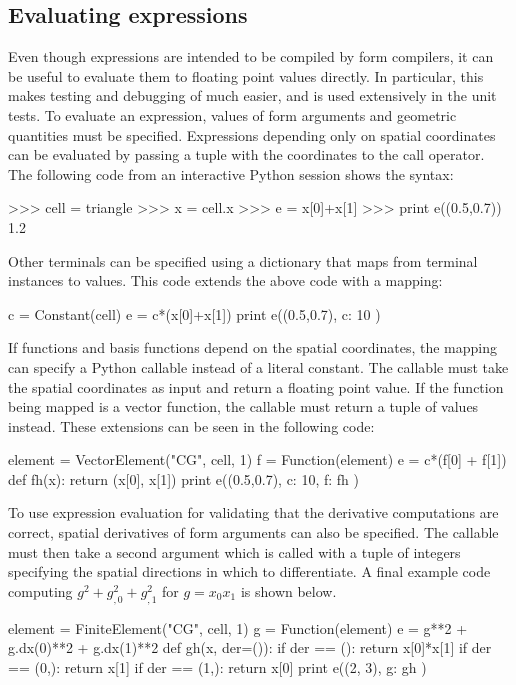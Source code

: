 \subsection{Evaluating expressions}
\label{ufl:sec:evaluating}

Even though \ufl{} expressions are intended to be compiled by form
compilers, it can be useful to evaluate them to floating point values
directly. In particular, this makes testing and debugging of \ufl{}
much easier, and is used extensively in the unit tests.  To evaluate
an \ufl{} expression, values of form arguments and geometric
quantities must be specified.  Expressions depending only on spatial
coordinates can be evaluated by passing a tuple with the coordinates
to the call operator. The following code from an interactive Python
session shows the syntax:
\begin{code}
>>> cell = triangle
>>> x = cell.x
>>> e = x[0]+x[1]
>>> print e((0.5,0.7))
1.2
\end{code}
Other terminals can be specified using a dictionary that maps from
terminal instances to values.  This code extends the above code with a
mapping:
\begin{code}
c = Constant(cell)
e = c*(x[0]+x[1])
print e((0.5,0.7), { c: 10 })
\end{code}
If functions and basis functions depend on the spatial coordinates,
the mapping can specify a Python callable instead of a literal
constant.  The callable must take the spatial coordinates as input and
return a floating point value.  If the function being mapped is a
vector function, the callable must return a tuple of values instead.
These extensions can be seen in the following code:
\begin{code}
element = VectorElement("CG", cell, 1)
f = Function(element)
e = c*(f[0] + f[1])
def fh(x):
    return (x[0], x[1])
print e((0.5,0.7), { c: 10, f: fh })
\end{code}
To use expression evaluation for validating that the derivative
computations are correct, spatial derivatives of form arguments can
also be specified.  The callable must then take a second argument
which is called with a tuple of integers specifying the spatial
directions in which to differentiate. A final example code computing
$g^2 + g_{,0}^2 + g_{,1}^2$ for $g=x_0x_1$ is shown below.
\begin{code}
element = FiniteElement("CG", cell, 1)
g = Function(element)
e = g**2 + g.dx(0)**2 + g.dx(1)**2
def gh(x, der=()):
    if der == ():   return x[0]*x[1]
    if der == (0,): return x[1]
    if der == (1,): return x[0]
print e((2, 3), { g: gh })
\end{code}


